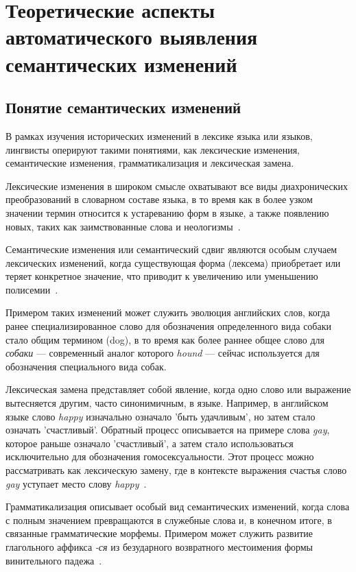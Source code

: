 \documentclass[LI,VKR]{HSEUniversity}
\begin{document}
\chapter{Теоретические аспекты автоматического выявления семантических изменений}

\section{Понятие семантических изменений}

В рамках изучения исторических изменений в лексике языка или языков, лингвисты оперируют
такими понятиями, как лексические изменения, семантические изменения,
грамматикализация и лексическая замена.

Лексические изменения в широком смысле охватывают все виды диахронических преобразований
в словарном составе языка, в то время как в более узком значении термин относится к
устареванию форм в языке, а также появлению новых, таких как заимствованные слова
и неологизмы~\cite{TahmasebiComputationalApproachesToSemanticChange}.

Семантические изменения или семантический сдвиг являются особым случаем лексических изменений,
когда существующая форма (лексема) приобретает или теряет конкретное значение,
что приводит к увеличению или уменьшению полисемии~\cite{TahmasebiComputationalApproachesToSemanticChange}.

Примером таких изменений может служить эволюция английских слов, когда ранее специализированное
слово для обозначения определенного вида собаки стало общим термином (dog),
в то время как более раннее общее слово для \textit{собаки} — современный аналог которого
\textit{hound} — сейчас используется для обозначения специального вида собак.

Лексическая замена представляет собой явление, когда одно слово или выражение вытесняется другим,
часто синонимичным, в языке.
Например, в английском языке слово \textit{happy} изначально означало ’быть удачливым’,
но затем стало означать ’счастливый’.
Обратный процесс описывается на примере слова \textit{gay}, которое раньше означало ’счастливый’,
а затем стало использоваться исключительно для обозначения гомосексуальности.
Этот процесс можно рассматривать как лексическую замену,
где в контексте выражения счастья слово \textit{gay}
уступает место слову \textit{happy}~\cite{TahmasebiComputationalApproachesToSemanticChange, Periti2024AnalyzingLexicalReplacements}.

Грамматикализация описывает особый вид семантических изменений, когда слова с
полным значением превращаются в служебные слова и, в конечном итоге,
в связанные грамматические морфемы.
Примером может служить развитие глагольного аффикса \textit{-ся} из
безударного возвратного местоимения формы винительного
падежа~\cite{TahmasebiComputationalApproachesToSemanticChange, Maysak2016}.
\end{document}
